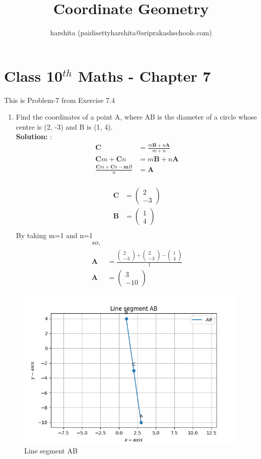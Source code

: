 \documentclass[10pt]{article}
\title{Coordinate Geometry}
\author{harshita (paidisettyharshita@sriprakashschools.com)}
\newcommand{\myvec}[1]{\ensuremath{\begin{pmatrix}#1\end{pmatrix}}}
\newcommand{\solution}{\noindent \textbf{Solution: }}
\let\vec\mathbf
\begin{document}
\maketitle
\section*{Class 10$^{th}$ Maths - Chapter 7}
This is Problem-7 from Exercise 7.4
\begin{enumerate}
\item Find the coordinates of a point A, where AB is the diameter of a circle whose centre is (2, -3) and B is (1, 4).\\

\solution:
\begin{align}
  \vec{C} &= \frac{m\vec{B}+n\vec{A}}{m+n}\\
\vec{C}m+\vec{C}n&=m\vec{B}+n\vec{A}\\
\frac{\vec{C}m+\vec{C}n-\vec{m}B}{n}&=\vec{A}\\
\end{align}

\begin{align}
\vec{C} &= \myvec{2\\-3}\\
\vec{B} &= \myvec{1\\4} \\
\end{align}
By taking m=1 and n=1
\begin{align}
so,\\
\vec{A}&=\frac{\myvec{2\\-3}+\myvec{2\\-3}-\myvec{1\\4}}{1}\\
\vec{A}&=\myvec{3\\-10}
\end{align}


\end{enumerate}
\begin{figure}[H]
			\centering
			\includegraphics[width=\columnwidth]{figs/Figure_1.png}
			\caption{Line segment AB}
			\label{fig:5}
		\end{figure}
\end{document}
